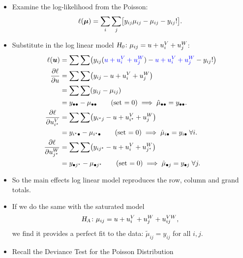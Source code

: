 \documentclass{article}\usepackage[]{graphicx}\usepackage[svgnames]{xcolor}
\let\exp\relax%
\let\log\relax%
\newcommand{\HN}{\textsl{H}_{\textsl{0}}}%
\newcommand{\HA}{\textsl{H}_{\textsl{A}}}%
\providecommand{\Vector}[1]{\bm{#1}}%
\begin{document}
\begin{itemize}
    \item Examine the log-likelihood from the Poisson:
          \[ \ell(\Vector{\mu})=\sum_i\sum_j\bigl[y_{ij}\log{\mu_{ij}}-\mu_{ij}-\log{y_{ij}!}\bigr]. \]
    \item Substitute in the log linear model \textcolor{Blue}{$ \HN\colon \log{\mu_{ij}}=u+u_i^V+u_j^W $}:
          \begin{align*}
              \ell(\Vector{u})
                            & =\sum\sum\bigl(y_{ij}(\textcolor{Blue}{u+u_i^V+u_j^W})-\exp{\textcolor{Blue}{u+u_i^V+u_j^W}}-\log{y_{ij}!}\bigr)          \\
              \pdv{\ell}{u} & =\sum\sum\bigl(y_{ij}-\exp{u+u_i^V+u_j^W}\bigr)                                                                           \\
                            & =\sum\sum(y_{ij}-\mu_{ij})                                                                                                \\
                            & =y_{\bullet\bullet}-\mu_{\bullet\bullet}\qquad \text{(set $=0$)}\implies \hat{\mu}_{\bullet\bullet}=y_{\bullet\bullet}.   \\
              \pdv{\ell}{u_{i^\star}^V}
                            & =\sum\sum\bigl(y_{i^\star j}-\exp{u+u_{i^\star}^V+u_j^W}\bigr)                                                            \\
                            & =y_{i^\star\bullet}-\mu_{i^\star\bullet}\qquad \text{(set $=0$)}\implies\hat{\mu}_{i\bullet}=y_{i\bullet}\;\forall i.     \\
              \pdv{\ell}{u_{j^\star}^W}
                            & =\sum\sum\bigl(y_{ij^\star}-\exp{u+u_{i}^V+u_{j^\star}^W}\bigr)                                                           \\
                            & =y_{\bullet j^\star}-\mu_{\bullet j^\star}\qquad \text{(set $=0$)}\implies\hat{\mu}_{\bullet j}=y_{\bullet j}\;\forall j.
          \end{align*}
    \item So the main effects log linear model reproduces the row, column and grand totals.
    \item If we do the same with the saturated model
          \[ \HA\colon\log{\mu_{ij}}=u+u_i^V+u_j^W+u_{ij}^{VW}, \]
          we find it provides a perfect fit to the data: $ \tilde{\mu}_{ij}=y_{ij} $ for all $ i,j $.
    \item Recall the Deviance Test for the Poisson Distribution

\end{itemize}
\end{document}
